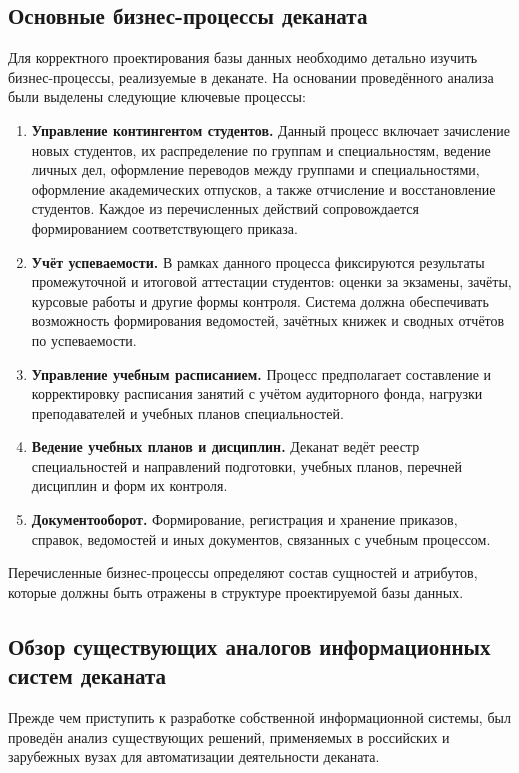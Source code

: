 \documentclass[14pt, a4paper]{extreport}
\begin{document}
\subsection{Основные бизнес-процессы деканата}
Для корректного проектирования базы данных необходимо детально изучить бизнес-процессы, реализуемые в деканате. На основании проведённого анализа были выделены следующие ключевые процессы:
\begin{enumerate}
    \item \textbf{Управление контингентом студентов.} Данный процесс включает зачисление новых студентов, их распределение по группам и специальностям, ведение личных дел, оформление переводов между группами и специальностями, оформление академических отпусков, а также отчисление и восстановление студентов. Каждое из перечисленных действий сопровождается формированием соответствующего приказа.
    \item \textbf{Учёт успеваемости.} В рамках данного процесса фиксируются результаты промежуточной и итоговой аттестации студентов: оценки за экзамены, зачёты, курсовые работы и другие формы контроля. Система должна обеспечивать возможность формирования ведомостей, зачётных книжек и сводных отчётов по успеваемости.
    \item \textbf{Управление учебным расписанием.} Процесс предполагает составление и корректировку расписания занятий с учётом аудиторного фонда, нагрузки преподавателей и учебных планов специальностей.
    \item \textbf{Ведение учебных планов и дисциплин.} Деканат ведёт реестр специальностей и направлений подготовки, учебных планов, перечней дисциплин и форм их контроля.
    \item \textbf{Документооборот.} Формирование, регистрация и хранение приказов, справок, ведомостей и иных документов, связанных с учебным процессом.
\end{enumerate}
Перечисленные бизнес-процессы определяют состав сущностей и атрибутов, которые должны быть отражены в структуре проектируемой базы данных.

\subsection{Обзор существующих аналогов информационных систем деканата}
Прежде чем приступить к разработке собственной информационной системы, был проведён анализ существующих решений, применяемых в российских и зарубежных вузах для автоматизации деятельности деканата.
\end{document}
